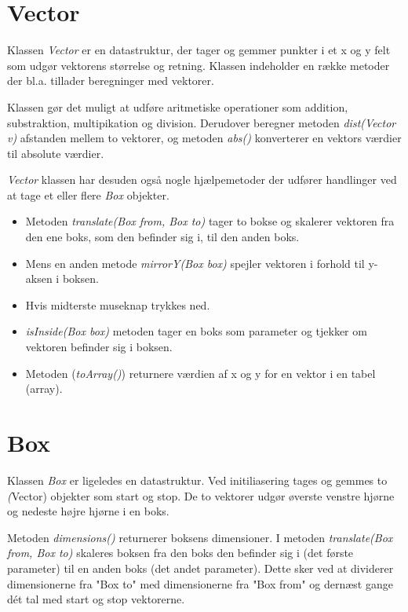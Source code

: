 \section{Vector}

Klassen \emph{Vector} er en datastruktur, der tager og gemmer punkter i et x og y felt som udgør vektorens størrelse og retning. Klassen indeholder en række metoder der bl.a. tillader beregninger med vektorer.

Klassen gør det muligt at udføre aritmetiske operationer som addition, substraktion, multipikation og division. Derudover beregner metoden \emph{dist(Vector v)} afstanden mellem to vektorer, og metoden \emph{abs()} konverterer en vektors værdier til absolute værdier.

\emph{Vector} klassen har desuden også nogle hjælpemetoder der udfører handlinger ved at tage et eller flere \emph{Box} objekter.

\begin{itemize}
	\item Metoden \emph{translate(Box from, Box to)} tager to bokse og skalerer vektoren fra den ene boks, som den befinder sig i, til den anden boks.
	\item Mens en anden metode \emph{mirrorY(Box box)} spejler vektoren i forhold til y-aksen i boksen.
	\item Hvis midterste museknap trykkes ned.
	\item \emph{isInside(Box box)} metoden tager en boks som parameter og tjekker om vektoren befinder sig i boksen.
	\item Metoden (\emph{toArray()}) returnere værdien af x og y for en vektor i en tabel (array).
\end{itemize}

\section{Box}

Klassen \emph{Box} er ligeledes en datastruktur. Ved initiliasering tages og gemmes to \emph(Vector) objekter som start og stop. De to vektorer udgør øverste venstre hjørne og nedeste højre hjørne i en boks.

Metoden \emph{dimensions()} returnerer boksens dimensioner. I metoden \emph{translate(Box from, Box to)} skaleres boksen fra den boks den befinder sig i (det første parameter) til en anden boks (det andet parameter). Dette sker ved at dividerer dimensionerne fra "Box to" med dimensionerne fra "Box from" og dernæst gange dét tal med start og stop vektorerne.

